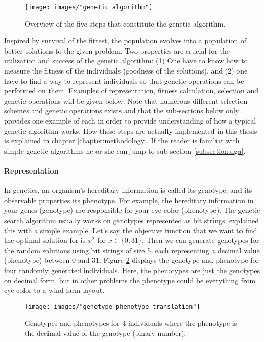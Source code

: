 \begin{figure}[h!]
\begin{center}
\texttt{[image: images/"genetic algorithm"]}
\caption{Overview of the five steps that constitute the genetic algorithm.}
\label{GA}
\end{center}
\end{figure}


\noindent Inspired by survival of the fittest, the population evolves into a population of better solutions to the given problem. Two properties are crucial for the utilization and success of the genetic algorithm: (1) One have to know how to measure the fitness of the individuals (goodness of the solutions), and (2) one have to find a way to represent individuals so that genetic operations can be performed on them. Examples of representation, fitness calculation, selection and genetic operations will be given below. Note that numerous different selection schemes and genetic operations exists and that the sub-sections below only provides one example of each in order to provide understanding of how a typical genetic algorithm works. How these steps are actually implemented in this thesis is explained in chapter \ref{chapter:methodology}. If the reader is familiar with simple genetic algorithms he or she can jump to sub-section \ref{subsection:dga}. \\ 


\paragraph*{Representation}
In genetics, an organism's hereditary information is called its genotype, and its observable properties its phenotype. For example, the hereditary information in your genes (genotype) are responsible for your eye color (phenotype). The genetic search algorithm usually works on genotypes represented as bit strings. \cite{Goldberg} explained this with a simple example. Let's say the objective function that we want to find the optimal solution for is $x^2$ for $x \in \{0, 31\}$. Then we can generate genotypes for the random solutions using bit strings of size 5, each representing a decimal value (phenotype) between 0 and 31. Figure \ref{Representation} displays the genotype and phenotype for four randomly generated individuals. Here, the phenotypes are just the genotypes on decimal form, but in other problems the phenotype could be everything from eye color to a wind farm layout.


\begin{figure}[h!]
\begin{center}
\texttt{[image: images/"genotype-phenotype translation"]}
\caption{Genotypes and phenotypes for 4 individuals where the phenotype is the decimal value of the genotype (binary number).}
\label{Representation}
\end{center}
\end{figure}


